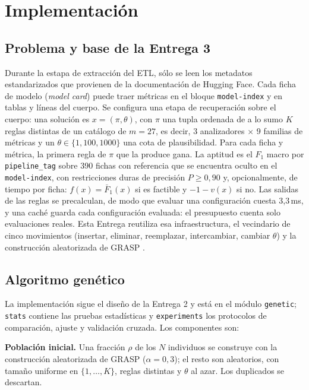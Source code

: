 \documentclass[conference]{IEEEtran}
\begin{document}
	\section{Implementaci\'on}
	
	\subsection{Problema y base de la Entrega 3}
	Durante la estapa de extracción del ETL\cite{repo}, sólo se leen los metadatos estandarizados que provienen de la documentación de Hugging Face. Cada ficha de modelo (\emph{model card}) \cite{mitchell} puede traer m\'etricas en el bloque \texttt{model-index} y en tablas y l\'ineas del cuerpo. Se configura una etapa de recuperaci\'on sobre el cuerpo: una soluci\'on es $x=(\pi,\theta)$, con $\pi$ una tupla ordenada de a lo sumo $K$ reglas distintas de un cat\'alogo de $m=27$, es decir, 3 analizadores $\times$ 9 familias de m\'etricas y un $\theta\in\{1,100,1000\}$ una cota de plausibilidad. Para cada ficha y m\'etrica, la primera regla de $\pi$ que la produce gana. La aptitud es el $F_1$ macro por \texttt{pipeline\_tag} sobre 390 fichas con referencia que se encuentra oculto en el \texttt{model-index}, con restricciones duras de precisi\'on $P\ge0{,}90$ y, opcionalmente, de tiempo por ficha: $f(x)=\bar F_1(x)$ si es factible y $-1-v(x)$ si no. Las salidas de las reglas se precalculan, de modo que evaluar una configuraci\'on cuesta 3,3\,ms, y una cach\'e guarda cada configuraci\'on evaluada: el presupuesto cuenta solo evaluaciones reales. Esta Entrega reutiliza esa infraestructura, el vecindario de cinco movimientos (insertar, eliminar, reemplazar, intercambiar, cambiar $\theta$) y la construcci\'on aleatorizada de GRASP \cite{feo}.
	
	\subsection{Algoritmo gen\'etico}
	La implementaci\'on sigue el dise\~no de la Entrega 2 \cite{gendreau,goldberg} y est\'a en el m\'odulo \texttt{genetic}; \texttt{stats} contiene las pruebas estad\'isticas y \texttt{experiments} los protocolos de comparaci\'on, ajuste y validaci\'on cruzada. Los componentes son:
	
	\textbf{Poblaci\'on inicial.} Una fracci\'on $\rho$ de los $N$ individuos se construye con la construcci\'on aleatorizada de GRASP ($\alpha=0{,}3$); el resto son aleatorios, con tama\~no uniforme en $\{1,\dots,K\}$, reglas distintas y $\theta$ al azar. Los duplicados se descartan.
	
\end{document}
